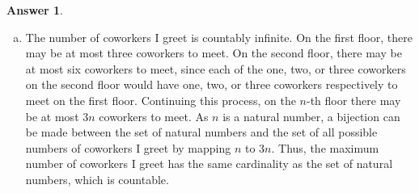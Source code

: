 \documentclass[article, 12pt]{article}
\theoremstyle{definition}
\newtheorem{answer}{Answer}
\begin{document}
    \begin{answer} \
        \begin{enumerate}[a)]
            \item The number of coworkers I greet is countably infinite. On the first floor, there may be at most three coworkers to meet. On the second floor, there may be at most six coworkers to meet, since each of the one, two, or three coworkers on the second floor would have one, two, or three coworkers respectively to meet on the first floor. Continuing this process, on the $n$-th floor there may be at most $3n$ coworkers to meet. As $n$ is a natural number, a bijection can be made between the set of natural numbers and the set of all possible numbers of coworkers I greet by mapping $n$ to $3n$. Thus, the maximum number of coworkers I greet has the same cardinality as the set of natural numbers, which is countable.


\end{enumerate}
\end{answer}
\end{document}
